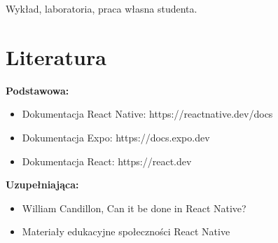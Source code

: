 \documentclass[12pt, a4paper]{article}
\begin{document}
Wykład, laboratoria, praca własna studenta.

\section{Literatura}

\textbf{Podstawowa:}
\begin{itemize}
  \item Dokumentacja React Native: https://reactnative.dev/docs
  \item Dokumentacja Expo: https://docs.expo.dev
  \item Dokumentacja React: https://react.dev
\end{itemize}

\textbf{Uzupełniająca:}
\begin{itemize}
  \item William Candillon, Can it be done in React Native?
  \item Materiały edukacyjne społeczności React Native
\end{itemize}
\end{document}
